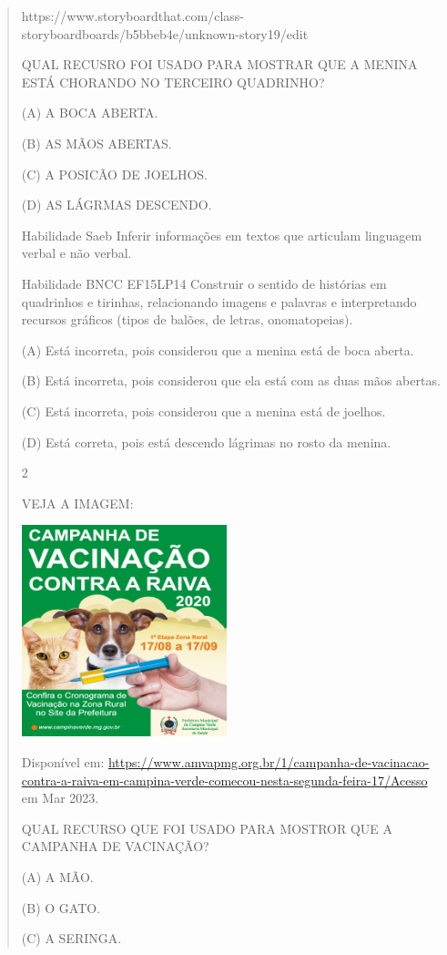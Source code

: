 {{{{\begin{verse}
{{\begin{escolha}
{{{{{https://www.storyboardthat.com/class-storyboardboards/b5bbeb4e/unknown-story19/edit

QUAL RECUSRO FOI USADO PARA MOSTRAR QUE A MENINA ESTÁ CHORANDO NO
TERCEIRO QUADRINHO?

(A) A BOCA ABERTA.

(B) AS MÃOS ABERTAS.

(C) A POSICÃO DE JOELHOS.

(D) AS LÁGRMAS DESCENDO.

\protect\hypertarget{_Hlk129246313}{}{}Habilidade Saeb Inferir
informações em textos que articulam linguagem verbal e não verbal.

Habilidade BNCC EF15LP14 Construir o sentido de histórias em quadrinhos
e tirinhas, relacionando imagens e palavras e interpretando recursos
gráficos (tipos de balões, de letras, onomatopeias).

(A) Está incorreta, pois considerou que a menina está de boca aberta.

(B) Está incorreta, pois considerou que ela está com as duas mãos
abertas.

(C) Está incorreta, pois considerou que a menina está de joelhos.

(D) Está correta, pois está descendo lágrimas no rosto da menina.

\num{2}

VEJA A IMAGEM:

\includegraphics[width=2.34507in,height=2.41801in]{media/image137.png}

Disponível em:
\url{https://www.amvapmg.org.br/1/campanha-de-vacinacao-contra-a-raiva-em-campina-verde-comecou-nesta-segunda-feira-17/Acesso}
em Mar 2023.

QUAL RECURSO QUE FOI USADO PARA MOSTROR QUE A CAMPANHA DE VACINAÇÃO?

(A) A MÃO.

(B) O GATO.

(C) A SERINGA.

}}}}}
\end{escolha}}}
\end{verse}}}}}
